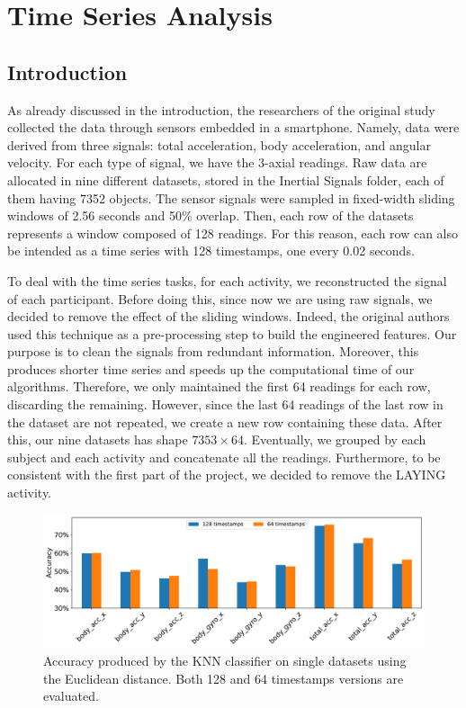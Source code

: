 \documentclass[10pt, a4paper, twocolumn]{article}
\begin{document}
\section{Time Series Analysis}

\subsection{Introduction} \label{sec:time_series_introduction}

As already discussed in the introduction, the researchers of the original study collected the data through sensors embedded in a smartphone. Namely, data were derived from three signals: total acceleration, body acceleration, and angular velocity. For each type of signal, we have the 3-axial readings. Raw data are allocated in nine different datasets, stored in the Inertial Signals folder, each of them having 7352 objects. The sensor signals were sampled in fixed-width sliding windows of 2.56 seconds and 50\% overlap. Then, each row of the datasets represents a window composed of 128 readings. For this reason, each row can also be intended as a time series with 128 timestamps, one every 0.02 seconds. 

To deal with the time series tasks, for each activity, we reconstructed the signal of each participant. Before doing this, since now we are using raw signals, we decided to remove the effect of the sliding windows. Indeed, the original authors used this technique as a pre-processing step to build the engineered features. Our purpose is to clean the signals from redundant information. Moreover, this produces shorter time series and speeds up the computational time of our algorithms.  Therefore, we only maintained the first 64 readings for each row, discarding the remaining. However, since the last 64 readings of the last row in the dataset are not repeated, we create a new row containing these data. After this, our nine datasets has shape $7353 \times 64$. Eventually, we grouped by each subject and each activity and concatenate all the readings. Furthermore, to be consistent with the first part of the project, we decided to remove the LAYING activity.

\begin{figure}[b]
	\centering
	\includegraphics[width=\columnwidth]{immagini simone/output_46_0.pdf}
	\caption{Accuracy produced by the KNN classifier on single datasets using the Euclidean distance. Both 128 and 64 timestamps versions are evaluated.}
	\label{fig:file_accuracy}
\end{figure}
 
\end{document}
